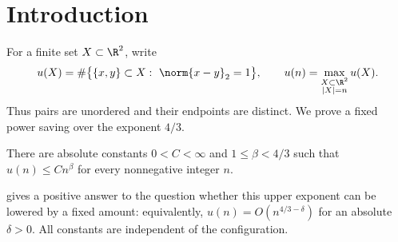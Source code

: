\section{Introduction}\label{sec:introduction}

For a finite set \(X\subset\R^2\), write
\[
 u(X)=\#\bigl\{\{x,y\}\subset X:\ \norm{x-y}_2=1\bigr\},
 \qquad
 u(n)=\max_{\substack{X\subset\R^2\\ |X|=n}}u(X).
\]
Thus pairs are unordered and their endpoints are distinct. We prove a fixed
power saving over the exponent \(4/3\).

\begin{theorem}\label{thm:main}
There are absolute constants \(0<C<\infty\) and \(1\le\beta<4/3\) such that
\(u(n)\le Cn^\beta\) for every nonnegative integer \(n\).
\end{theorem}

 gives a positive answer to the question whether this upper
exponent can be lowered by a fixed amount: equivalently,
\(u(n)=O(n^{4/3-\delta})\) for an absolute \(\delta>0\).
All constants are independent of the configuration.
